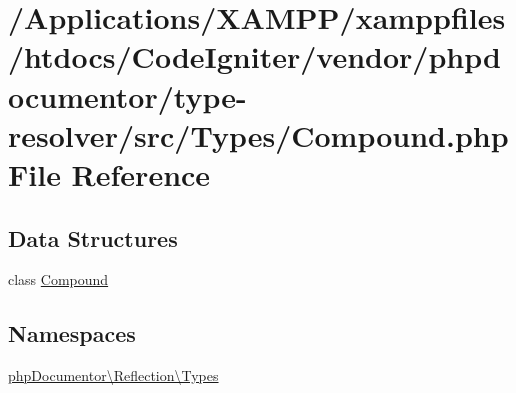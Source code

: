 \hypertarget{_compound_8php}{}\section{/\+Applications/\+X\+A\+M\+P\+P/xamppfiles/htdocs/\+Code\+Igniter/vendor/phpdocumentor/type-\/resolver/src/\+Types/\+Compound.php File Reference}
\label{_compound_8php}
\subsection*{Data Structures}
\begin{DoxyCompactItemize}
\item 
class \mbox{\hyperlink{classphp_documentor_1_1_reflection_1_1_types_1_1_compound}{Compound}}
\end{DoxyCompactItemize}
\subsection*{Namespaces}
\begin{DoxyCompactItemize}
\item 
 \mbox{\hyperlink{namespacephp_documentor_1_1_reflection_1_1_types}{php\+Documentor\textbackslash{}\+Reflection\textbackslash{}\+Types}}
\end{DoxyCompactItemize}
